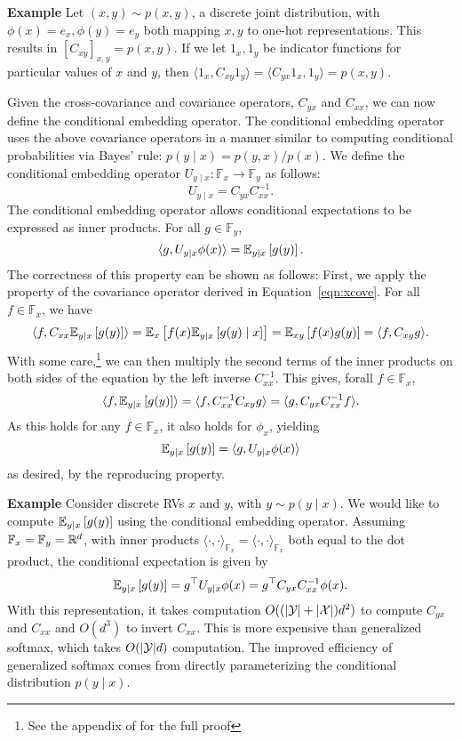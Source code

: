 \documentclass{article}
\begin{document}
\textbf{Example}
Let $(x,y)\sim p(x,y)$, a discrete joint distribution,
with $\phi(x)=e_x,\phi(y)=e_y$ both mapping $x,y$ to one-hot representations.
This results in $[C_{xy}]_{x,y}=p(x,y)$.
If we let $1_x,1_y$ be indicator functions for particular values of $x$ and $y$,
then $\langle 1_x, C_{xy}1_y\rangle = \langle C_{yx}1_x, 1_y\rangle= p(x,y)$.

Given the cross-covariance and covariance operators, $C_{yx}$ and $C_{xx}$,
we can now define the conditional embedding operator.
The conditional embedding operator uses the above covariance operators in a manner
similar to computing conditional probabilities via Bayes' rule: $p(y\mid x) = p(y,x)/p(x)$.
We define the conditional embedding operator $U_{y\mid x}: \mathbb{F}_x\to\mathbb{F}_y$
as follows:
\begin{equation}
    \label{eqn:conditional-mean}
    U_{y\mid x} = C_{yx}C_{xx}^{-1}.
\end{equation}
The conditional embedding operator allows conditional expectations to be
expressed as inner products.
For all $g \in \mathbb{F}_y$,
\begin{equation}
\label{eqn:conditional-expectation}
\langle g, U_{y\mid x}\phi(x) \rangle = \mathbb{E}_{y\mid x}\left[g(y)\right].
\end{equation}
The correctness of this property can be shown as follows:
First, we apply the property of the covariance operator derived in
Equation~\ref{eqn:xcove}. For all $f\in\mathbb{F}_x$, we have
\begin{equation}
\label{eqn:prf-conditional-expectation}
    \langle f, C_{xx}\mathbb{E}_{y\mid x}\left[g(y)\right]\rangle
    = \mathbb{E}_{x}\left[f(x)\mathbb{E}_{y\mid x}\left[g(y)\mid x\right]\right]
    = \mathbb{E}_{xy}\left[f(x)g(y)\right]
    = \langle f, C_{xy}g\rangle.
\end{equation}
With some care,\footnote{
See the appendix of \citet{fukumizu2004kernel} for the full proof}
we can then multiply the second terms of the inner products on both sides
of the equation by the left inverse $C_{xx}^{-1}$.
This gives, forall $f\in\mathbb{F}_x$,
$$\langle f, \mathbb{E}_{y\mid x}\left[g(y)\right]\rangle = \langle f, C_{xx}^{-1}C_{xy}g \rangle
= \langle g, C_{yx}C_{xx}^{-1}f\rangle.$$
As this holds for any $f\in\mathbb{F}_x$, it also holds for $\phi_x$,
yielding
$$
\mathbb{E}_{y\mid x}\left[g(y)\right] = \langle g, U_{y\mid x}\phi(x)\rangle
$$
as desired, by the reproducing property.

\textbf{Example}
Consider discrete RVs $x$ and $y$, with $y\sim p(y\mid x)$.
We would like to compute $\mathbb{E}_{y\mid x}\left[g(y)\right]$ using the conditional embedding operator.
Assuming $\mathbb{F}_x=\mathbb{F}_y=\mathbb{R}^d$,
with inner products
$\langle\cdot,\cdot\rangle_{\mathbb{F}_x}=\langle\cdot,\cdot\rangle_{\mathbb{F}_x}$
both equal to the dot product,
the conditional expectation is given by
$$\mathbb{E}_{y\mid x}\left[g(y)\right] = g^\top U_{y\mid x}\phi(x) = g^\top C_{yx}C_{xx}^{-1}\phi(x).$$
With this representation, it takes computation $O((|\mathcal{Y}|+|\mathcal{X}|)d^2)$
to compute $C_{yx}$ and $C_{xx}$ and $O(d^3)$ to invert $C_{xx}$.
This is more expensive than generalized softmax,
which takes $O(|\mathcal{Y}|d)$ computation.
The improved efficiency of generalized softmax comes from directly parameterizing
the conditional distribution $p(y\mid x)$.
\end{document}
